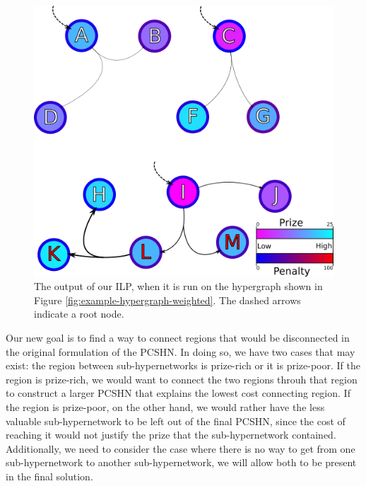 \documentclass[12pt,twoside]{reedthesis}
\theoremstyle{definition}
\begin{document}
\begin{figure}[hp]
  \begin{center}
    \includegraphics[width=\textwidth]{example-hypergraph-weighted-after-ILP}
  \caption[Output from ILP with disconnected sub-hypergraphs]{The output of our ILP, when it is run on the hypergraph shown in Figure \ref{fig:example-hypergraph-weighted}. The dashed arrows indicate a root node.}
  \label{fig:example-hypergraph-weighted-after-ILP}
  \end{center}
\end{figure}

Our new goal is to find a way to connect regions that would be disconnected in the original formulation of the PCSHN. In doing so, we have two cases that may exist: the region between sub-hypernetworks is prize-rich or it is prize-poor. If the region is prize-rich, we would want to connect the two regions throuh that region to construct a larger PCSHN that explains the lowest cost connecting region. If the region is prize-poor, on the other hand, we would rather have the less valuable sub-hypernetwork to be left out of the final PCSHN, since the cost of reaching it would not justify the prize that the sub-hypernetwork contained. Additionally, we need to consider the case where there is no way to get from one sub-hypernetwork to another sub-hypernetwork, we will allow both to be present in the final solution.\par
\end{document}
